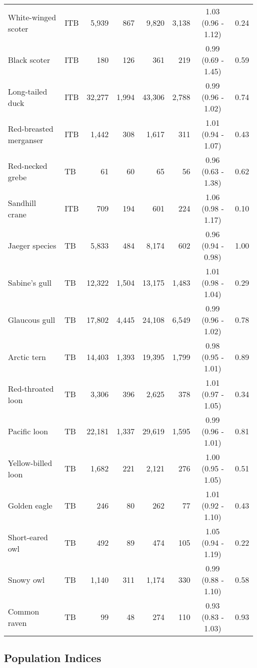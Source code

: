 \documentclass[
]{article}
\begin{document}
\begin{longtable}[t]{llrrrrcc}
White-winged scoter & ITB & 5,939 & 867 & 9,820 & 3,138 & 1.03 (0.96 - 1.12) & 0.24\\
Black scoter & ITB & 180 & 126 & 361 & 219 & 0.99 (0.69 - 1.45) & 0.59\\
Long-tailed duck & ITB & 32,277 & 1,994 & 43,306 & 2,788 & 0.99 (0.96 - 1.02) & 0.74\\
Red-breasted merganser & ITB & 1,442 & 308 & 1,617 & 311 & 1.01 (0.94 - 1.07) & 0.43\\
\addlinespace
Red-necked grebe & TB & 61 & 60 & 65 & 56 & 0.96 (0.63 - 1.38) & 0.62\\
Sandhill crane & ITB & 709 & 194 & 601 & 224 & 1.06 (0.98 - 1.17) & 0.10\\
Jaeger species & TB & 5,833 & 484 & 8,174 & 602 & 0.96 (0.94 - 0.98) & 1.00\\
Sabine's gull & TB & 12,322 & 1,504 & 13,175 & 1,483 & 1.01 (0.98 - 1.04) & 0.29\\
Glaucous gull & TB & 17,802 & 4,445 & 24,108 & 6,549 & 0.99 (0.96 - 1.02) & 0.78\\
\addlinespace
Arctic tern & TB & 14,403 & 1,393 & 19,395 & 1,799 & 0.98 (0.95 - 1.01) & 0.89\\
Red-throated loon & TB & 3,306 & 396 & 2,625 & 378 & 1.01 (0.97 - 1.05) & 0.34\\
Pacific loon & TB & 22,181 & 1,337 & 29,619 & 1,595 & 0.99 (0.96 - 1.01) & 0.81\\
Yellow-billed loon & TB & 1,682 & 221 & 2,121 & 276 & 1.00 (0.95 - 1.05) & 0.51\\
Golden eagle & TB & 246 & 80 & 262 & 77 & 1.01 (0.92 - 1.10) & 0.43\\
\addlinespace
Short-eared owl & TB & 492 & 89 & 474 & 105 & 1.05 (0.94 - 1.19) & 0.22\\
Snowy owl & TB & 1,140 & 311 & 1,174 & 330 & 0.99 (0.88 - 1.10) & 0.58\\
Common raven & TB & 99 & 48 & 274 & 110 & 0.93 (0.83 - 1.03) & 0.93\\
\bottomrule

\end{longtable}

\endgroup{}

\subsection*{Population Indices}\label{population-indices-1}
\end{document}
